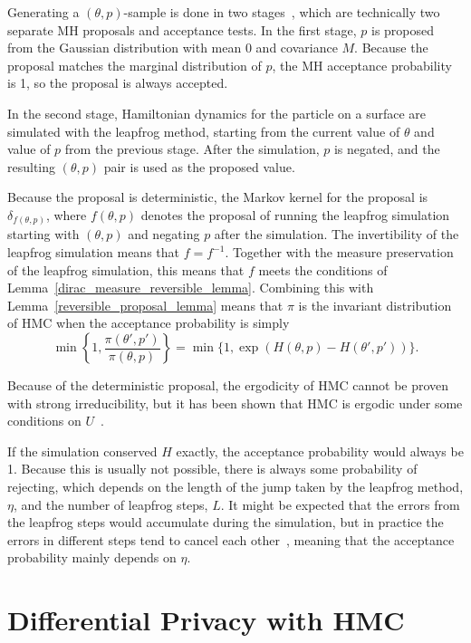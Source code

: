 \documentclass[english,twoside,openright]{HYgraduMLDS}
\begin{document}
Generating a \((\theta, p)\)-sample is done in two stages~\cite{neal2012mcmc}, 
which are technically 
two separate MH proposals and acceptance tests. In the first
stage, \(p\) is proposed from the Gaussian distribution with mean 0 and 
covariance \(M\). Because the proposal matches the marginal distribution of 
\(p\), the MH acceptance probability is 1, so the proposal
is always accepted.

In the second stage, Hamiltonian dynamics for the particle on a surface are 
simulated with the leapfrog method, starting from the current value 
of \(\theta\) and value of \(p\) from the previous stage. After the simulation,
\(p\) is negated, and the resulting \((\theta, p)\) pair is used as the
proposed value.

Because the proposal is deterministic, the Markov kernel for the
proposal is \(\delta_{f(\theta, p)}\), where \(f(\theta, p)\) denotes the proposal
of running the leapfrog simulation starting with \((\theta, p)\) and negating
\(p\) after the simulation. The invertibility of the leapfrog simulation means
that \(f = f^{-1}\). Together with the measure preservation of the leapfrog
simulation, this means that \(f\) meets the conditions of
Lemma~\ref{dirac_measure_reversible_lemma}. Combining this with
Lemma~\ref{reversible_proposal_lemma} means that \(\pi\) is the invariant
distribution of HMC when the acceptance probability is simply
\[
  \min\left\{1, \frac{\pi(\theta', p')}{\pi(\theta, p)}\right\}
  = \min\{1, \exp(H(\theta, p) - H(\theta', p'))\}.
\]

Because of the deterministic proposal, the ergodicity of HMC cannot be
proven with strong irreducibility, but it has been shown that HMC is
ergodic under some conditions on \(U\)~\cite{DMS19}.

If the simulation conserved \(H\) exactly, the acceptance probability would 
always be 1. Because this is usually not possible, there is always some probability 
of rejecting, which depends on the length of the jump taken by the leapfrog 
method, \(\eta\), and the number of leapfrog steps, \(L\). It might be expected 
that the errors from the leapfrog steps would accumulate during the simulation, 
but in practice the errors in different steps tend to cancel each 
other~\cite{neal2012mcmc}, meaning 
that the acceptance probability mainly depends on \(\eta\).

\newpage
\section{Differential Privacy with HMC}\label{dp_hmc_section}
\end{document}
